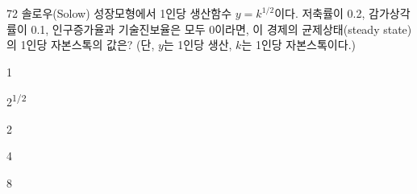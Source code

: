 \begin{question}{72}
솔로우(Solow) 성장모형에서 1인당 생산함수 $y=k^{ 1/2 }$이다. 저축률이 0.2, 감가상각률이 0.1, 인구증가율과 기술진보율은 모두 0이라면, 이 경제의 균제상태(steady state)의 1인당 자본스톡의 값은? (단, $y$는 1인당 생산, $k$는 1인당 자본스톡이다.)
\begin{choices}
  \item 1
  \item 2\textsuperscript{1/2}
  \item 2
  \item 4
  \item 8
\end{choices}
\end{question}
